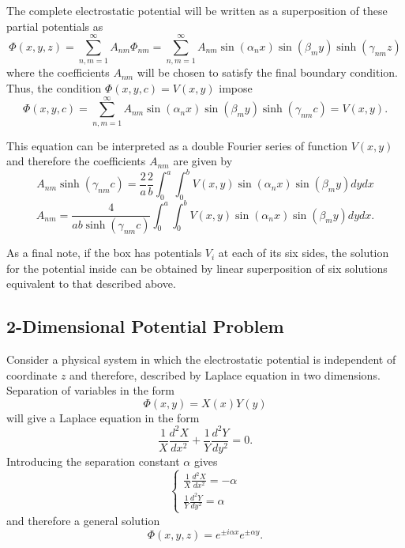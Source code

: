 The complete electrostatic potential will be written as a superposition of these partial potentials as
\begin{equation}
\Phi (x,y,z) = \sum_{n,m = 1}^\infty A_{nm} \Phi_{nm} = \sum_{n,m = 1}^\infty  A_{nm}  \sin (\alpha_n x) \sin (\beta_m y) \sinh (\gamma_{nm} z)
\end{equation}
where the coefficients $A_{nm} $ will be chosen to satisfy the final boundary condition. Thus, the condition $\Phi(x,y,c) = V(x,y)$ impose
\begin{equation}
\Phi (x,y,c)  = \sum_{n,m = 1}^\infty  A_{nm}  \sin (\alpha_n x) \sin (\beta_m y) \sinh (\gamma_{nm} c) = V(x,y).
\end{equation}

This equation can be interpreted as a double Fourier series of function $V(x,y)$ and therefore the coefficients $A_{nm}$ are given by
\begin{equation}
A_{nm} \sinh (\gamma_{nm} c) = \frac{2}{a} \frac{2}{b} \int_0^a \int_0^b V(x,y) \sin (\alpha_n x) \sin (\beta_m y) dy dx
\end{equation}
\begin{equation}
A_{nm}  = \frac{4}{ab \sinh (\gamma_{nm} c)}  \int_0^a \int_0^b V(x,y) \sin (\alpha_n x) \sin (\beta_m y) dy dx.
\end{equation}

As a final note, if the box has potentials $V_i$ at each of its six sides, the solution for the potential inside can be obtained by linear superposition of six solutions equivalent to that described above.

\subsection{2-Dimensional Potential Problem}
Consider a physical system in which the electrostatic potential is independent of coordinate $z$ and therefore, described by Laplace equation in two dimensions. Separation of variables in the form
\begin{equation}
\Phi (x,y) = X(x) Y(y)
\end{equation}
will give a Laplace equation in the form 
\begin{equation}
\frac{1}{X} \frac{d^2 X}{dx^2} + \frac{1}{Y} \frac{d^2 Y}{dy^2}  = 0.
\end{equation}
Introducing the separation constant $\alpha$ gives 
\begin{equation}
\begin{cases}
\frac{1}{X} \frac{d^2 X}{dx^2} = -\alpha  \\
\frac{1}{Y} \frac{d^2 Y}{dy^2} = \alpha  
\end{cases}
\end{equation}
and therefore a general solution 
\begin{equation}
\Phi (x,y,z) = e^{\pm i\alpha x} e^{\pm \alpha y}. \label{eq:General2DPotential}
\end{equation}

